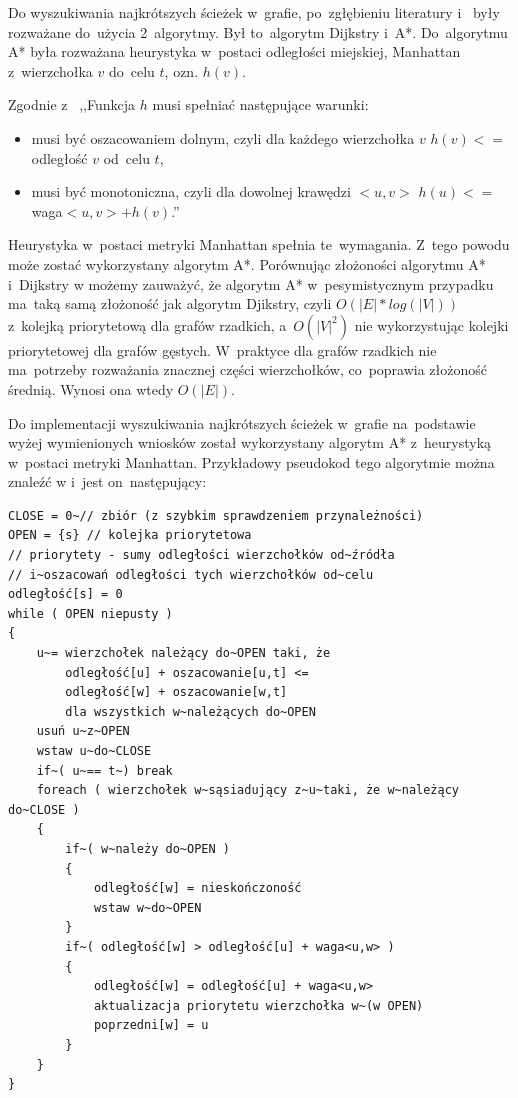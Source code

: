\documentclass[a4paper,11pt,twoside,openright]{report}
\theoremstyle{definition}
\begin{document}
Do wyszukiwania najkrótszych ścieżek w~grafie, po~zgłębieniu literatury
\cite{Algorytmy Sedgewick} i~\cite{AiSD2} były rozważane do~użycia 2~algorytmy.
Był to~algorytm Dijkstry i~A*. Do~algorytmu A* była rozważana heurystyka w~postaci
odległości miejskiej, Manhattan z~wierzchołka $v$ do~celu $t$, ozn. $h(v)$.

Zgodnie z~\cite{AiSD2} ,,Funkcja $h$ musi spełniać następujące warunki:

\begin{itemize}[noitemsep]
\item musi być oszacowaniem dolnym, czyli dla każdego wierzchołka $v$ $h(v) <=$ odległość $v$ od~celu $t$,
\item musi być monotoniczna, czyli dla dowolnej krawędzi $<u,v>$ $h(u) <= $waga$<u,v> + h(v)$.''
\end{itemize}

Heurystyka w~postaci metryki Manhattan spełnia te~wymagania. Z~tego powodu może
zostać wykorzystany algorytm A*. Porównując złożoności algorytmu A* i~Dijkstry w
\cite{AiSD2} możemy zauważyć, że algorytm A* w~pesymistycznym przypadku ma~taką
samą złożoność jak algorytm Djikstry, czyli $O(|E|*log(|V|))$ z~kolejką priorytetową
dla grafów rzadkich, a~$O(|V|^2)$ nie wykorzystując kolejki priorytetowej dla
grafów gęstych. W~praktyce dla grafów rzadkich nie ma~potrzeby rozważania znacznej
części wierzchołków, co~poprawia złożoność średnią. Wynosi ona wtedy $O(|E|)$.

Do implementacji wyszukiwania najkrótszych ścieżek w~grafie na~podstawie wyżej
wymienionych wniosków został wykorzystany algorytm A* z~heurystyką w~postaci
metryki Manhattan. Przykładowy pseudokod tego algorytmie można znaleźć w
\cite{AiSD2} i~jest on~następujący: %

\begin{verbatim}
CLOSE = 0~// zbiór (z szybkim sprawdzeniem przynależności)
OPEN = {s} // kolejka priorytetowa
// priorytety - sumy odległości wierzchołków od~źródła
// i~oszacowań odległości tych wierzchołków od~celu
odległość[s] = 0
while ( OPEN niepusty )
{
    u~= wierzchołek należący do~OPEN taki, że
        odległość[u] + oszacowanie[u,t] <=
        odległość[w] + oszacowanie[w,t]
        dla wszystkich w~należących do~OPEN
    usuń u~z~OPEN
    wstaw u~do~CLOSE
    if~( u~== t~) break
    foreach ( wierzchołek w~sąsiadujący z~u~taki, że w~należący do~CLOSE )
    {
        if~( w~należy do~OPEN )
        {
            odległość[w] = nieskończoność
            wstaw w~do~OPEN
        }
        if~( odległość[w] > odległość[u] + waga<u,w> )
        {
            odległość[w] = odległość[u] + waga<u,w>
            aktualizacja priorytetu wierzchołka w~(w OPEN)
            poprzedni[w] = u
        }
    }
}
\end{verbatim}
\end{document}

